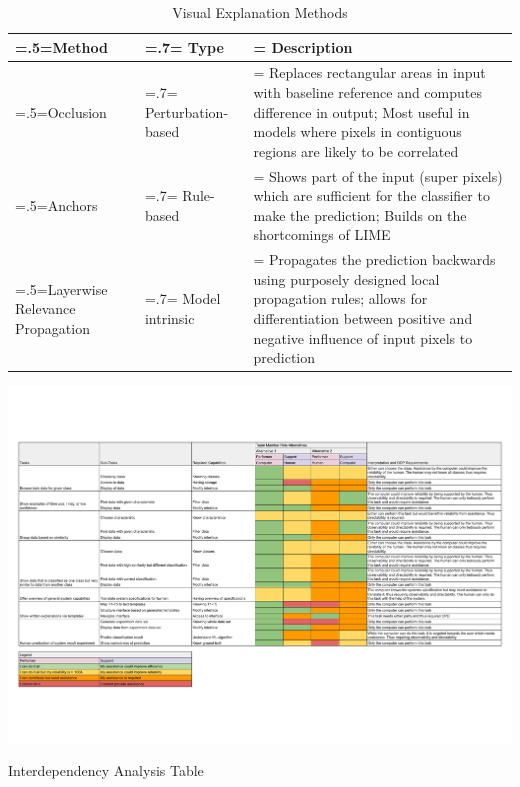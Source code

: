 \documentclass[11pt,a4paper,english]{scrreprt}
\begin{document}
\begin{table}[htbp]
    \centering
    \begin{tabularx}{\textwidth}{ 
            >{\hsize=.5\hsize\linewidth=\hsize}X
            >{\hsize=.7\hsize\linewidth=\hsize}X
            >{\hsize=1.8\hsize\linewidth=\hsize}X
        }
        \toprule
        Method & Type & Description \\
        \midrule
        Occlusion & Perturbation-based & Replaces rectangular areas in input with baseline reference and computes difference in output; Most useful in models where pixels in contiguous regions are likely to be correlated \\ 
        Anchors & Rule-based & Shows part of the input (super pixels) which are sufficient for the classifier to make the prediction; Builds on the shortcomings of LIME \parencite{ribeiro_why_2016}\\  
        Layerwise Relevance Propagation & Model intrinsic & Propagates the prediction backwards using purposely 
        designed local propagation rules; allows for differentiation between positive and negative influence of input pixels to prediction \\
        \bottomrule
    \end{tabularx}
    \caption{Visual Explanation Methods}
    \label{table:visual_explanation_methods}
\end{table}

\begin{table}[htbp]
    \centering
    \includegraphics[height=\textwidth, angle=90]{img/figures/Interdependency_Analysis_Table.pdf}
    \caption{Interdependency Analysis Table}
    \label{table:interdependency_analysis_table}
\end{table}
\end{document}

